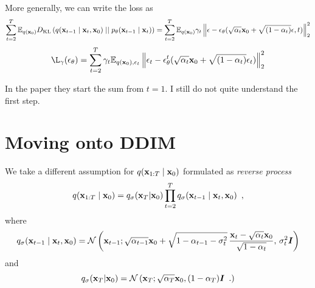 More generally, we can write the loss as
\begin{equation*}
    \sum_{t=2}^T \mathbb{E}_{q({\mathbf{x}}_0)} 
    D_{\mathrm{KL}}\left( q({\mathbf{x}}_{t-1} \mid {\mathbf{x}}_{t}, {\mathbf{x}}_0) \mid\mid p_{\theta}({\mathbf{x}}_{t-1} \mid {\mathbf{x}}_{t}) \right) 
    = \sum_{t=2}^T \mathbb{E}_{q({\mathbf{x}}_0)} \gamma_t \left\lVert 
        {\mathbf{\epsilon}} - {\mathbf{\epsilon}}_{\theta}(\sqrt{\alpha_t} {\mathbf{x}}_0 + \sqrt{(1 - \alpha_t)} {\mathbf{\epsilon}}, t)
    \right\rVert_{2}^{2}
\end{equation*}
\begin{equation}
    \L_{\gamma}(\rvepsilon_{\theta}) = \sum_{t=2}^T \gamma_t \E_{q(\rvx_0), \rvepsilon_t}
    \left\lVert 
        \rvepsilon_t - \rvepsilon_{\theta}^{t}(\sqrt{\alpha_t} \rvx_0 + \sqrt{(1 - \alpha_t)} \rvepsilon_t)
    \right\rVert_{2}^{2}
\end{equation}
\begin{notebox}[colback=red!5]
    In the paper they start the sum from $t=1$. I still do not quite understand the first step.
\end{notebox}

\section{Moving onto DDIM}\label{sec:ddim_ddim}
We take a different assumption for $q({\mathbf{x}}_{1:T} \mid {\mathbf{x}}_0)$ formulated as \textit{reverse process} 
\begin{equation}
    q({\mathbf{x}}_{1:T} \mid {\mathbf{x}}_0) = q_\sigma({\mathbf{x}}_T | {\mathbf{x}}_0) \prod_{t=2}^T q_\sigma({\mathbf{x}}_{t-1} \mid {\mathbf{x}}_t, {\mathbf{x}}_0) \enspace ,
\end{equation}
where
\begin{equation}
    q_\sigma({\mathbf{x}}_{t-1} \mid {\mathbf{x}}_t, {\mathbf{x}}_0) 
    = \mathcal{N} \left( {\mathbf{x}}_{t-1};
    \sqrt{\alpha_{t-1}}{\mathbf{x}}_0
    + \sqrt{1 - \alpha_{t-1} - \sigma_t^2} \, \frac{{\mathbf{x}}_t - \sqrt{\alpha_t}{\mathbf{x}}_0}{\sqrt{1-\alpha_t}}, \, \sigma_t^2 {\bm{I}}
    \right)
\end{equation}
and
\begin{equation}
    q_\sigma({\mathbf{x}}_T | {\mathbf{x}}_0) = \mathcal{N} \left(  {\mathbf{x}}_T;
    \sqrt{\alpha_T} {\mathbf{x}}_0, (1-\alpha_T) {\bm{I}} \enspace .
    \right)
\end{equation}

